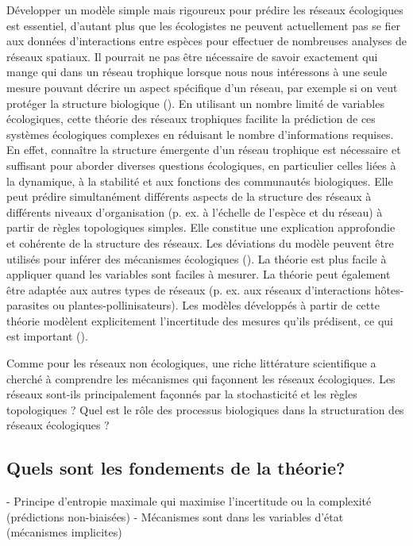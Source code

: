 Développer un modèle simple mais rigoureux pour prédire les réseaux écologiques
est essentiel, d'autant plus que les écologistes ne peuvent actuellement pas se
fier aux données d'interactions entre espèces pour effectuer de nombreuses
analyses de réseaux spatiaux. Il pourrait ne pas être nécessaire de savoir
exactement qui mange qui dans un réseau trophique lorsque nous nous intéressons
à une seule mesure pouvant décrire un aspect spécifique d'un réseau, par exemple
si on veut protéger la structure biologique (\cite{McCann2007Protecting}). En
utilisant un nombre limité de variables écologiques, cette théorie des réseaux
trophiques facilite la prédiction de ces systèmes écologiques complexes en
réduisant le nombre d'informations requises. En effet, connaître la structure
émergente d'un réseau trophique est nécessaire et suffisant pour aborder
diverses questions écologiques, en particulier celles liées à la dynamique, à la
stabilité et aux fonctions des communautés biologiques. Elle peut prédire
simultanément différents aspects de la structure des réseaux à différents
niveaux d'organisation (p. ex. à l'échelle de l'espèce et du réseau) à partir de
règles topologiques simples. Elle constitue une explication approfondie et
cohérente de la structure des réseaux. Les déviations du modèle peuvent être
utilisés pour inférer des mécanismes écologiques (\cite{Harte2014Maximuma}). La
théorie est plus facile à appliquer quand les variables sont faciles à mesurer.
La théorie peut également être adaptée aux autres types de réseaux (p. ex. aux
réseaux d'interactions hôtes-parasites ou plantes-pollinisateurs). Les modèles
développés à partir de cette théorie modèlent explicitement l'incertitude des
mesures qu'ils prédisent, ce qui est important (\cite{Simmonds2022Insights}). 

Comme pour les réseaux non écologiques, une riche littérature scientifique a
cherché à comprendre les mécanismes qui façonnent les réseaux écologiques. Les
réseaux sont-ils principalement façonnés par la stochasticité et les règles
topologiques ? Quel est le rôle des processus biologiques dans la structuration
des réseaux écologiques ?

\subsection{Quels sont les fondements de la théorie?} 

- Principe d'entropie maximale qui maximise l'incertitude ou la complexité (prédictions non-biaisées) 
- Mécanismes sont dans les variables d'état (mécanismes implicites)

